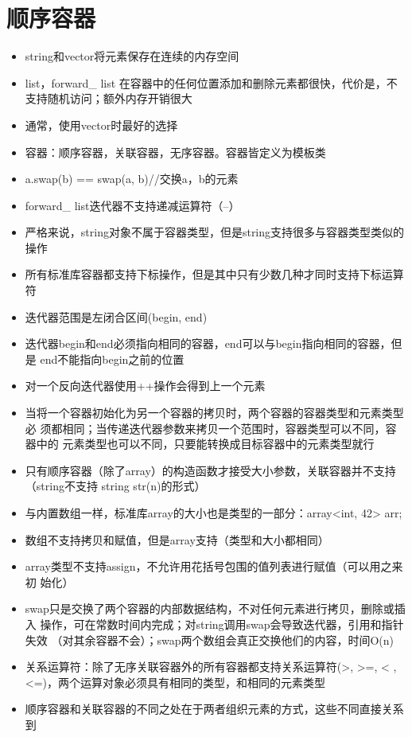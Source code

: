 \documentclass[11pt]{article}
\begin{document}
\section{顺序容器}
\label{sec-6}
\begin{itemize}
\item string和vector将元素保存在连续的内存空间
\item list，forward\_ list 在容器中的任何位置添加和删除元素都很快，代价是，不
支持随机访问；额外内存开销很大
\item 通常，使用vector时最好的选择
\item 容器：顺序容器，关联容器，无序容器。容器皆定义为模板类
\item a.swap(b) == swap(a, b)//交换a，b的元素
\item forward\_ list迭代器不支持递减运算符（--）
\item 严格来说，string对象不属于容器类型，但是string支持很多与容器类型类似的
操作
\item 所有标准库容器都支持下标操作，但是其中只有少数几种才同时支持下标运算符
\item 迭代器范围是左闭合区间(begin, end)
\item 迭代器begin和end必须指向相同的容器，end可以与begin指向相同的容器，但是
end不能指向begin之前的位置
\item 对一个反向迭代器使用++操作会得到上一个元素
\item 当将一个容器初始化为另一个容器的拷贝时，两个容器的容器类型和元素类型必
须都相同；当传递迭代器参数来拷贝一个范围时，容器类型可以不同，容器中的
元素类型也可以不同，只要能转换成目标容器中的元素类型就行
\item 只有顺序容器（除了array）的构造函数才接受大小参数，关联容器并不支持
（string不支持 string str(n)的形式）
\item 与内置数组一样，标准库array的大小也是类型的一部分：array<int, 42> arr;
\item 数组不支持拷贝和赋值，但是array支持（类型和大小都相同）
\item array类型不支持assign，不允许用花括号包围的值列表进行赋值（可以用之来初
始化）
\item swap只是交换了两个容器的内部数据结构，不对任何元素进行拷贝，删除或插入
操作，可在常数时间内完成；对string调用swap会导致迭代器，引用和指针失效
（对其余容器不会）；swap两个数组会真正交换他们的内容，时间O(n)
\item 关系运算符：除了无序关联容器外的所有容器都支持关系运算符(>, >=, < ,
<=)，两个运算对象必须具有相同的类型，和相同的元素类型
\item 顺序容器和关联容器的不同之处在于两者组织元素的方式，这些不同直接关系到

\end{itemize}
\end{document}
